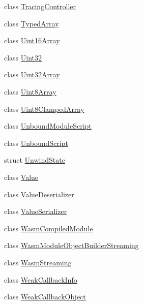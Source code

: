 \begin{DoxyCompactItemize}
class \mbox{\hyperlink{classv8_1_1TracingController}{Tracing\+Controller}}
\item 
class \mbox{\hyperlink{classv8_1_1TypedArray}{Typed\+Array}}
\item 
class \mbox{\hyperlink{classv8_1_1Uint16Array}{Uint16\+Array}}
\item 
class \mbox{\hyperlink{classv8_1_1Uint32}{Uint32}}
\item 
class \mbox{\hyperlink{classv8_1_1Uint32Array}{Uint32\+Array}}
\item 
class \mbox{\hyperlink{classv8_1_1Uint8Array}{Uint8\+Array}}
\item 
class \mbox{\hyperlink{classv8_1_1Uint8ClampedArray}{Uint8\+Clamped\+Array}}
\item 
class \mbox{\hyperlink{classv8_1_1UnboundModuleScript}{Unbound\+Module\+Script}}
\item 
class \mbox{\hyperlink{classv8_1_1UnboundScript}{Unbound\+Script}}
\item 
struct \mbox{\hyperlink{structv8_1_1UnwindState}{Unwind\+State}}
\item 
class \mbox{\hyperlink{classv8_1_1Value}{Value}}
\item 
class \mbox{\hyperlink{classv8_1_1ValueDeserializer}{Value\+Deserializer}}
\item 
class \mbox{\hyperlink{classv8_1_1ValueSerializer}{Value\+Serializer}}
\item 
class \mbox{\hyperlink{classv8_1_1WasmCompiledModule}{Wasm\+Compiled\+Module}}
\item 
class \mbox{\hyperlink{classv8_1_1WasmModuleObjectBuilderStreaming}{Wasm\+Module\+Object\+Builder\+Streaming}}
\item 
class \mbox{\hyperlink{classv8_1_1WasmStreaming}{Wasm\+Streaming}}
\item 
class \mbox{\hyperlink{classv8_1_1WeakCallbackInfo}{Weak\+Callback\+Info}}
\item 
class \mbox{\hyperlink{classv8_1_1WeakCallbackObject}{Weak\+Callback\+Object}}
\end{DoxyCompactItemize}
